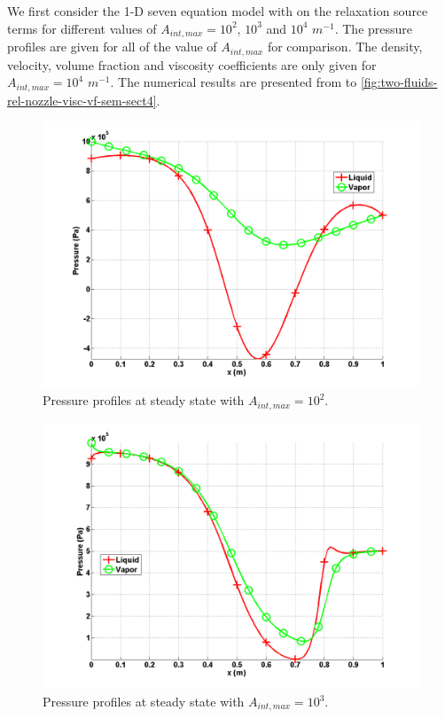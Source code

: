 We first consider the 1-D seven equation model with on the relaxation source terms for different values of $A_{int,max} = 10^2 \text{, } 10^3$ and $10^4$ $m^{-1}$. The pressure profiles are given for all of the value of $A_{int,max}$ for comparison. The density, velocity, volume fraction and viscosity coefficients are only given for $A_{int,max} = 10^4$ $m^{-1}$. The numerical results are presented from  to \ref{fig:two-fluids-rel-nozzle-visc-vf-sem-sect4}.
%
\begin{figure}[H]
\centering
\includegraphics[width=\textwidth]{figures/SEM/Aint1e2_two_phases_pressure.png}
\caption{Pressure profiles at steady state with $A_{int,max} = 10^2$.}
\label{fig:two-fluids-rel-nozzle-press-Aint2-sem-sect4}
\end{figure}
%
\begin{figure}[H]
\centering
\includegraphics[width=\textwidth]{figures/SEM/Aint1e3_two_phases_pressure.png}
\caption{Pressure profiles at steady state with $A_{int,max} = 10^3$.}
\label{fig:two-fluids-rel-nozzle-press-Aint3-sem-sect4}
\end{figure}
